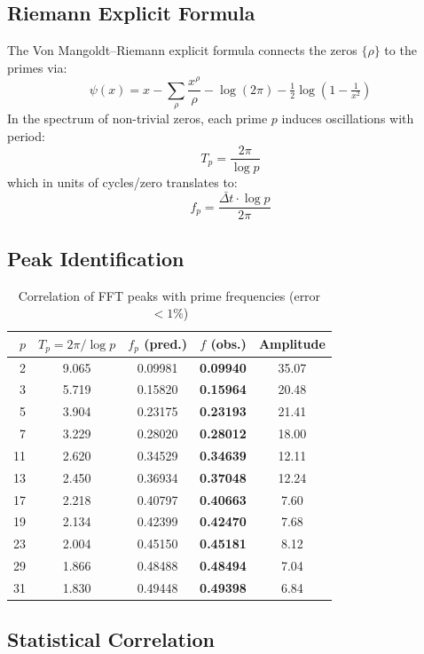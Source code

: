 \documentclass[12pt, a4paper]{article}
\begin{document}
\subsection{Riemann Explicit Formula}

The Von Mangoldt–Riemann explicit formula connects the zeros $\{\rho\}$
to the primes via:
\[
  \psi(x) = x - \sum_{\rho} \frac{x^\rho}{\rho}
            - \log(2\pi) - \tfrac{1}{2}\log\!\left(1-\tfrac{1}{x^2}\right)
\]
In the spectrum of non-trivial zeros, each prime $p$ induces oscillations
with period:
\[
  T_p = \frac{2\pi}{\log p}
\]
which in units of cycles/zero translates to:
\[
  f_p = \frac{\bar{\Delta t} \cdot \log p}{2\pi}
\]

\subsection{Peak Identification}

\begin{table}[H]
\centering
\caption{Correlation of FFT peaks with prime frequencies (error $< 1\%$)}
\begin{tabular}{rcccc}
\toprule
$p$ & $T_p = 2\pi/\log p$ & $f_p$ (pred.) & $f$ (obs.) & Amplitude \\
\midrule
 2 & 9.065 & 0.09981 & \textbf{0.09940} & 35.07 \\
 3 & 5.719 & 0.15820 & \textbf{0.15964} & 20.48 \\
 5 & 3.904 & 0.23175 & \textbf{0.23193} & 21.41 \\
 7 & 3.229 & 0.28020 & \textbf{0.28012} & 18.00 \\
11 & 2.620 & 0.34529 & \textbf{0.34639} & 12.11 \\
13 & 2.450 & 0.36934 & \textbf{0.37048} & 12.24 \\
17 & 2.218 & 0.40797 & \textbf{0.40663} &  7.60 \\
19 & 2.134 & 0.42399 & \textbf{0.42470} &  7.68 \\
23 & 2.004 & 0.45150 & \textbf{0.45181} &  8.12 \\
29 & 1.866 & 0.48488 & \textbf{0.48494} &  7.04 \\
31 & 1.830 & 0.49448 & \textbf{0.49398} &  6.84 \\
\bottomrule
\end{tabular}
\end{table}

\subsection{Statistical Correlation}
\end{document}
